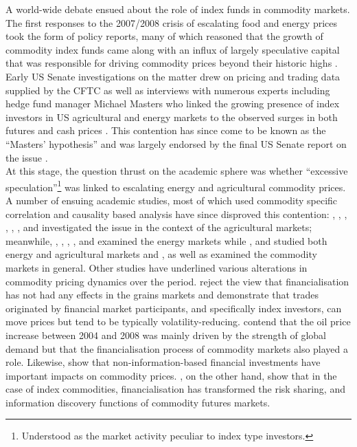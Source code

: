 \documentclass[
  authoryear,
  preprint,
  3p]{elsarticle}
\begin{document}
A world-wide debate ensued about the role of index funds in commodity
markets. The first responses to the 2007/2008 crisis of escalating food
and energy prices took the form of policy reports, many of which
reasoned that the growth of commodity index funds came along with an
influx of largely speculative capital that was responsible for driving
commodity prices beyond their historic highs
\citep{deschutter_food_2010, gilbert_speculative_2010, herman_not_2011, schumann_hunger_2011, unctad_global_2009}.\\
Early US Senate investigations on the matter drew on pricing and trading
data supplied by the CFTC as well as interviews with numerous experts
including hedge fund manager Michael Masters who linked the growing
presence of index investors in US agricultural and energy markets to the
observed surges in both futures and cash prices
\citep{masters_testimony_2008, masters_accidental_2008}. This contention
has since come to be known as the ``Masters' hypothesis'' and was
largely endorsed by the final US Senate report on the issue
\citep{senate_excessive_2009}.\\
At this stage, the question thrust on the academic sphere was whether
``excessive speculation''\footnote{Understood as the market activity
  peculiar to index type investors.} was linked to escalating energy and
agricultural commodity prices. A number of ensuing academic studies,
most of which used commodity specific correlation and causality based
analysis have since disproved this contention: \citet{irwin_devil_2009},
\citet{sanders_adequacy_2010}, \citet{sanders_impact_2011},
\citet{sanders_new_2011}, \citet{irwin_commodity_2013},
\citet{brunetti_commodity_2014}, \citet{hamilton_effects_2015} and
\citet{bruno_financialisation_2017} investigated the issue in the
context of the agricultural markets; meanwhile,
\citet{buyuksahin_speculators_2011}, \citet{tokic_speculation_2012},
\citet{fattouh_role_2013}, \citet{kilian_role_2014},
\citet{knittel_simple_2016} and \citet{manera_modelling_2016} examined
the energy markets while \citet{bohl_does_2013}, \citet{kim_does_2015}
and \citet{boyd_prevalence_2016} studied both energy and agricultural
markets and \citet{irwin_index_2011},
\citet{irwin_financialisation_2012} as well as
\citet{stoll_commodity_2011} examined the commodity markets in general.
Other studies have underlined various alterations in commodity pricing
dynamics over the period. \citet{gilbert_role_2014} reject the view that
financialisation has not had any effects in the grains markets and
demonstrate that trades originated by financial market participants, and
specifically index investors, can move prices but tend to be typically
volatility-reducing. \citet{juvenal_speculation_2015} contend that the
oil price increase between 2004 and 2008 was mainly driven by the
strength of global demand but that the financialisation process of
commodity markets also played a role. Likewise,
\citet{henderson_new_2015} show that non-information-based financial
investments have important impacts on commodity prices.
\citet{cheng_financialisation_2014}, on the other hand, show that in the
case of index commodities, financialisation has transformed the risk
sharing, and information discovery functions of commodity futures
markets.
\end{document}

